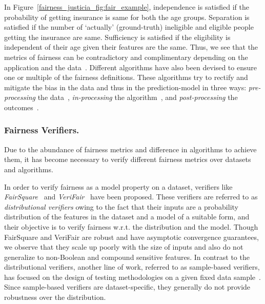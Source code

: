 In Figure~\ref{fairness_justicia_fig:fair_example}, independence is satisfied if the probability of getting insurance is same for both the age groups. Separation is satisfied if the number of `actually' (ground-truth) ineligible and eligible people getting the insurance are same. Sufficiency is satisfied if the eligibility is independent of their age given their features are the same.
Thus, we see that the metrics of fairness can be contradictory and complimentary depending on the application and the data~\cite{corbett2018measure}.
Different algorithms have also been devised to ensure one or multiple of the fairness definitions.
These algorithms try to rectify and mitigate the bias in the data and thus in the prediction-model in three ways: \textit{pre-processing} the data~\cite{kamiran2012data,zemel2013learning,calmon2017optimized}, \textit{in-processing} the algorithm~\cite{zhang2018mitigating}, and \textit{post-processing} the outcomes~\cite{kamiran2012decision,hardt2016equality}.

\subsubsection{Fairness Verifiers.} Due to the abundance of fairness metrics and difference in algorithms to achieve them, it has become necessary to verify different fairness metrics over datasets and algorithms. 

In order to verify fairness as a model property on a dataset, verifiers like \textit{FairSquare}~\cite{albarghouthi2017fairsquare} and \textit{VeriFair}~\cite{bastani2019probabilistic} have been proposed. 
These verifiers are referred to as {\em distributional verifiers} owing to the fact that their inputs are a probability  distribution of the features in the dataset and a model of a suitable form, and their objective is to verify fairness w.r.t. the distribution and the model.
Though FairSquare and VeriFair are robust and have asymptotic convergence guarantees, we observe that they scale up poorly with the size of inputs and also do not generalize to non-Boolean and compound sensitive features.
In contrast to the distributional verifiers, another line of work, referred to as sample-based verifiers, has focused on the design of testing methodologies  on a given fixed data sample~\cite{galhotra2017fairness,aif360-oct-2018}. 
Since sample-based verifiers are dataset-specific, they generally do not provide robustness over the distribution.


